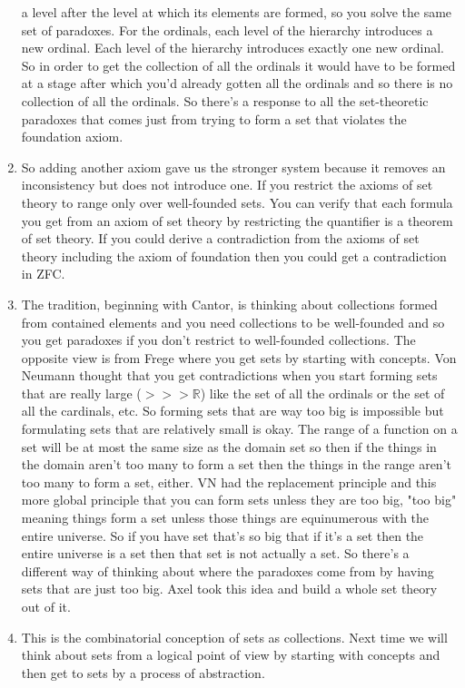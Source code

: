 \documentclass[12pt]{article}
\theoremstyle{definition}
\begin{document}
\begin{enumerate}
        a level after the level at which its elements are formed, so you solve
        the same set of paradoxes. For the ordinals, each level of the
        hierarchy introduces a new ordinal. Each level of the hierarchy
        introduces exactly one new ordinal. So in order to get the collection
        of all the ordinals it would have to be formed at a stage after which
        you'd already gotten all the ordinals and so there is no collection of
        all the ordinals. So there's a response to all the set-theoretic
        paradoxes that comes just from trying to form a set that violates the
        foundation axiom. 
    \item
        So adding another axiom gave us the stronger system because it removes
        an inconsistency but does not introduce one. If you restrict the axioms
        of set theory to range only over well-founded sets. You can verify that
        each formula you get from an axiom of set theory by restricting the
        quantifier is a theorem of set theory. If you could derive a
        contradiction from the axioms of set theory including the axiom of
        foundation then you could get a contradiction in ZFC.
    \item
        The tradition, beginning with Cantor, is thinking about collections
        formed from contained elements and you need collections to be
        well-founded and so you get paradoxes if you don't restrict to
        well-founded collections. The opposite view is from Frege where you get
        sets by starting with concepts. Von Neumann thought that you get
        contradictions when you start forming sets that are really large ($>>>
        \mathbb{R}$) like the set of all the ordinals or the set of all the
        cardinals, etc. So forming sets that are way too big is impossible but
        formulating sets that are relatively small is okay. The range of a
        function on a set will be at most the same size as the domain set so
        then if the things in the domain aren't too many to form a set then the
        things in the range aren't too many to form a set, either. VN had the
        replacement principle and this more global principle that you can form
        sets unless they are too big, "too big" meaning things form a set
        unless those things are equinumerous with the entire universe. So if
        you have set that's so big that if it's a set then the entire universe
        is a set then that set is not actually a set. So there's a different
        way of thinking about where the paradoxes come from by having sets that
        are just too big. Axel took this idea and build a whole set theory out
        of it. 
    \item
        This is the combinatorial conception of sets as collections. Next time
        we will think about sets from a logical point of view by starting with
        concepts and then get to sets by a process of abstraction.
\end{enumerate}
\end{document}
